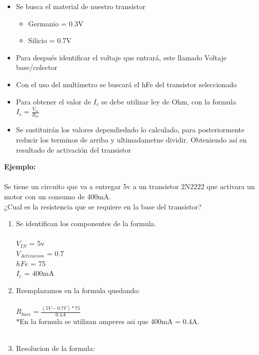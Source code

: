 \documentclass[letterpaper]{article}
\begin{document}
\begin{large}
    \begin{itemize}
        \item Se busca el material de nuestro transistor
        \begin{itemize}
            \item Germanio = 0.3V
            \item Silicio = 0.7V
        \end{itemize}
        \item Para después identificar el voltaje que entrará, este llamado Voltaje base/colector
        \item Con el uso del multímetro se buscará el hFe del transistor seleccionado
        \item Para obtener el valor de $I_c$ se debe utilizar ley de Ohm, con la formula $I_c=\frac{V_{cc}}{R_{cc}}$
        \item Se sustituirán los valores dependiedndo lo calculado, para posteriormente reducir los terminos de arriba y ultimadametne dividir. Obteniendo así en resultado de activación del transistor
    \end{itemize}
    \begin{large}
        \textbf{Ejemplo:}\\\\
        Se tiene un circuito que va a entregar 5v a un transistor 2N2222 que activara un motor con un consumo de 400mA.\\
        ¿Cual es la resistencia que se requiere en la base del transistor?\\
        \begin{enumerate}
            \item Se identifican los componentes de la formula.\\\\
            $V_{IN}$ = 5v\\
            $V_{Activacion}$ = 0.7\\
            $hFe$ = 75\\
            $I_{c}$ = 400mA\\
            \item Reemplazamos en la formula quedando:\\\\
                $R_{base}= \frac{(5V-0.7V)*75}{0.4A}$\\
                $*$En la formula se utilizan amperes asi que 400mA = 0.4A.\\\\
            \item Resolucion de la formula:\\\\

\end{enumerate}
\end{large}
\end{large}
\end{document}
